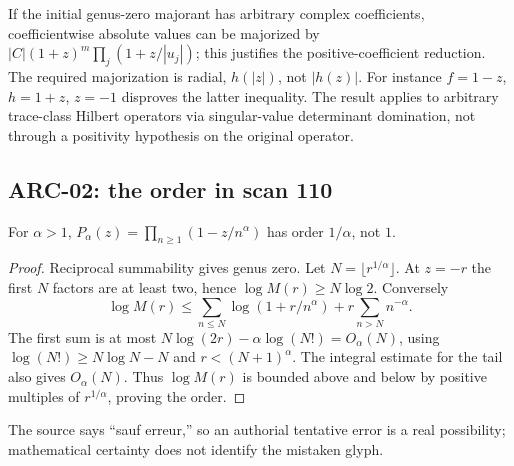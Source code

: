 \documentclass[11pt,a4paper]{article}
\begin{document}
If the initial genus-zero majorant has arbitrary complex coefficients, coefficientwise absolute values can be majorized by
$|C|(1+z)^m\prod_j(1+z/|u_j|)$; this justifies the positive-coefficient reduction. The required majorization is radial, $h(|z|)$, not $|h(z)|$. For instance $f=1-z$, $h=1+z$, $z=-1$ disproves the latter inequality. The result applies to arbitrary trace-class Hilbert operators via singular-value determinant domination, not through a positivity hypothesis on the original operator.

\subsection{ARC-02: the order in scan 110}
For $\alpha>1$, $P_\alpha(z)=\prod_{n\ge1}(1-z/n^\alpha)$ has order $1/\alpha$, not $1$.
\begin{proof}
Reciprocal summability gives genus zero. Let $N=\lfloor r^{1/\alpha}\rfloor$. At $z=-r$ the first $N$ factors are at least two, hence $\log M(r)\ge N\log2$. Conversely
\[
 \log M(r)\le \sum_{n\le N}\log(1+r/n^\alpha)+r\sum_{n>N}n^{-\alpha}.
\]
The first sum is at most $N\log(2r)-\alpha\log(N!)=O_\alpha(N)$, using $\log(N!)\ge N\log N-N$ and $r<(N+1)^\alpha$. The integral estimate for the tail also gives $O_\alpha(N)$. Thus $\log M(r)$ is bounded above and below by positive multiples of $r^{1/\alpha}$, proving the order.
\end{proof}
The source says ``sauf erreur,'' so an authorial tentative error is a real possibility; mathematical certainty does not identify the mistaken glyph.
\end{document}
